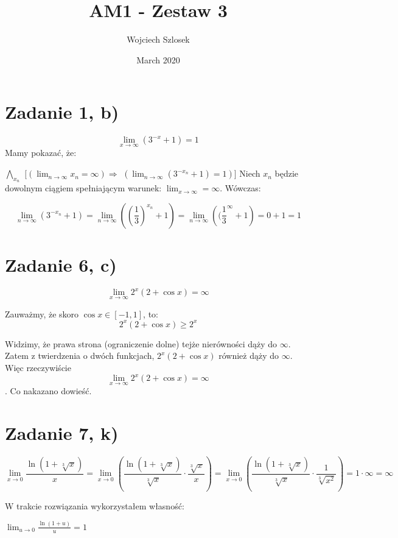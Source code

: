 \documentclass{article}
\title{AM1 - Zestaw 3}
\author{Wojciech Szlosek}
\date{March 2020}
\begin{document}
\maketitle

\section{Zadanie 1, b)} 

$$\lim_{x \to \infty}({3}^{-x}+1) = 1 $$ 
\newline
Mamy pokazać, że: \newline

$ \bigwedge_{x_{n}}$ $[( \lim_{n \to \infty} x_{n} = \infty ) \Rightarrow$ $(\lim_{n \to \infty} (3^{-x_{n}}+ 1) = 1)]$ \newline \newline
Niech $x_{n}$ będzie dowolnym ciągiem spełniającym warunek: $\lim_{x \to \infty} = \infty $. Wówczas: 

$$ \lim_{n \to \infty} (3^{-x_{n}}+ 1) = \lim_{n \to \infty} ({(\frac{1}{3})}^{x_{n}} + 1) = \lim_{n \to \infty} ({(\frac{1}{3}}^{\infty} + 1) = 0 + 1 = 1 $$

\section{Zadanie 6, c)}
 
 $$\lim_{x \to \infty} 2^{x}(2+\cos x) = \infty$$ \newline

        Zauważmy, że skoro $\cos x \in [-1, 1]$, to: \newline \newline
        $$2^x(2+\cos x) \ge 2^x$$ \newline
        
        Widzimy, że prawa strona (ograniczenie dolne) tejże nierówności dąży do $\infty$.
        Zatem z twierdzenia o dwóch funkcjach, $2^{x}(2+\cos x) $ również dąży do $\infty$. Więc rzeczywiście $$\lim_{x \to \infty} 2^{x}(2+\cos x) = \infty$$. \newline
        Co nakazano dowieść.
        
\section{Zadanie 7, k)}

$$\lim_{x \to 0} \frac{\ln(1+\sqrt[3]{x})}{x} = \lim_{x \to 0} (\frac{\ln(1+\sqrt[3]{x})}{\sqrt[3]{x}} \cdot \frac{\sqrt[3]{x}}{x}) = \lim_{x \to 0} (\frac{\ln(1+\sqrt[3]{x})}{\sqrt[3]{x}} \cdot \frac{1}{\sqrt[3]{x^{2}}}) = 1 \cdot \infty = \infty $$ \newline

W trakcie rozwiązania wykorzystałem własność: \newline

$\lim_{u \to 0} {\frac{\ln(1+u)}{u}} = 1$
\end{document}
